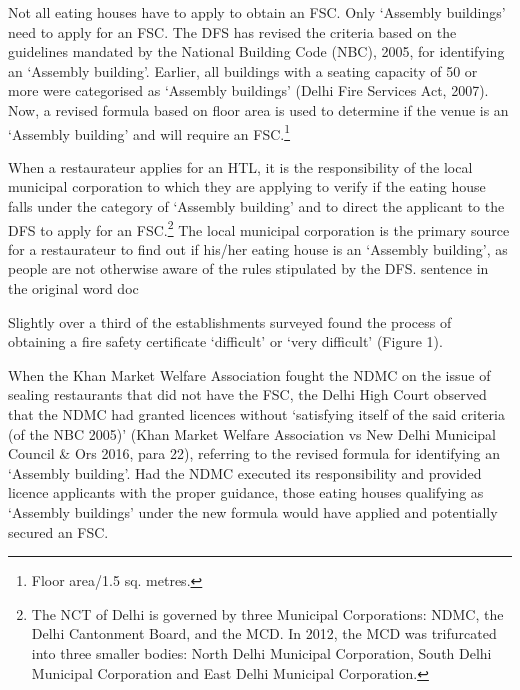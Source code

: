 \documentclass[a4paper, 12pt]{article}
\begin{document}
		Not all eating houses have to apply to obtain an FSC. Only ‘Assembly buildings’ need to apply for an FSC. The DFS has revised the criteria based on the guidelines mandated by the National Building Code (NBC), 2005, for identifying an ‘Assembly 
building’. Earlier, all buildings with a seating capacity of 50 or more were categorised as ‘Assembly buildings’ (Delhi Fire Services Act, 2007). Now, a revised formula based on floor area is used to determine if the venue is an ‘Assembly building’ and will require an 
FSC.\footnote{Floor area/1.5 sq. metres.} 
		
		When a restaurateur applies for an HTL, it is the responsibility of the local municipal corporation to which they are applying to verify if the eating house falls under the category of ‘Assembly building’ and to direct the applicant to the DFS to apply for an 
FSC.\footnote{The NCT of Delhi is governed by three Municipal Corporations: NDMC, the Delhi Cantonment Board, and the MCD. In 2012, the MCD was trifurcated into three smaller bodies: North Delhi Municipal Corporation, South Delhi Municipal Corporation 
and East Delhi Municipal Corporation.} The local municipal corporation is the primary source for a restaurateur to find out if his/her eating house is an ‘Assembly building’, as people are not otherwise aware of the rules stipulated by the DFS. %
sentence in the original word doc
		
		Slightly over a third of the establishments surveyed found the process of obtaining a fire safety certificate ‘difficult’ or ‘very difficult’ (Figure 1). 
		
		When the Khan Market Welfare Association fought the NDMC on the issue of sealing restaurants that did not have the FSC, the Delhi High Court observed that the NDMC had granted licences without ‘satisfying itself of the said criteria (of the NBC 
2005)’ (Khan Market Welfare Association vs New Delhi Municipal Council \& Ors 2016, para 22), referring to the revised formula for identifying an ‘Assembly building’. Had the NDMC executed its responsibility and provided licence applicants with the proper 
guidance, those eating houses qualifying as ‘Assembly buildings’ under the new formula would have applied and potentially secured an FSC.%
		
     
\end{document}
